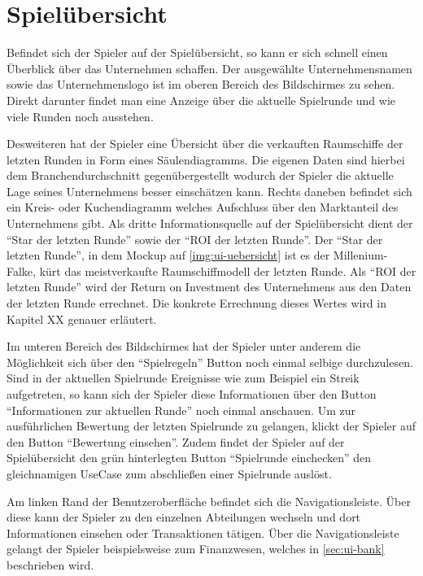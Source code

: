 \section{Spielübersicht}
\label{sec:ui-uebersicht}

Befindet sich der Spieler auf der Spielübersicht, so kann er sich schnell einen Überblick über das Unternehmen schaffen. Der ausgewählte Unternehmensnamen sowie das Unternehmenslogo ist im oberen Bereich des Bildschirmes zu sehen. Direkt darunter findet man eine Anzeige über die aktuelle Spielrunde und wie viele Runden noch ausstehen. 

Desweiteren hat der Spieler eine Übersicht über die verkauften Raumschiffe der letzten Runden in Form eines Säulendiagramms. Die eigenen Daten sind hierbei dem Branchendurchschnitt gegenübergestellt wodurch der Spieler die aktuelle Lage seines Unternehmens besser einschätzen kann. Rechts daneben befindet sich ein Kreis- oder Kuchendiagramm welches Aufschluss über den Marktanteil des Unternehmens gibt. Als dritte Informationsquelle auf der Spielübersicht dient der “Star der letzten Runde” sowie der “ROI der letzten Runde”. Der “Star der letzten Runde”, in dem Mockup auf \vref{img:ui-uebersicht} ist es der Millenium-Falke, kürt das meistverkaufte Raumschiffmodell der letzten Runde. Als “ROI der letzten Runde” wird der Return on Investment des Unternehmens aus den Daten der letzten Runde errechnet. Die konkrete Errechnung dieses Wertes wird in Kapitel XX genauer erläutert.

Im unteren Bereich des Bildschirmes hat der Spieler unter anderem die Möglichkeit sich über den “Spielregeln” Button noch einmal selbige durchzulesen. Sind in der aktuellen Spielrunde Ereignisse wie zum Beispiel ein Streik aufgetreten, so kann sich der Spieler diese Informationen über den Button “Informationen zur aktuellen Runde” noch einmal anschauen. Um zur ausführlichen Bewertung der letzten Spielrunde zu gelangen, klickt der Spieler auf den Button “Bewertung einsehen”. Zudem findet der Spieler auf der Spielübersicht den grün hinterlegten Button “Spielrunde einchecken” den gleichnamigen UseCase zum abschließen einer Spielrunde auslöst. 

Am linken Rand der Benutzeroberfläche befindet sich die Navigationsleiste. Über diese kann der Spieler zu den einzelnen Abteilungen wechseln und dort Informationen einsehen oder Transaktionen tätigen. Über die Navigationsleiste gelangt der Spieler beispielsweise zum Finanzwesen, welches in \ref{sec:ui-bank} beschrieben wird. 

